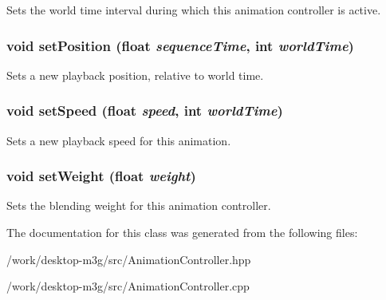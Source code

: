 Sets the world time interval during which this animation controller is active. \hypertarget{classm3g_1_1AnimationController_a20a5553bd449b21bad74666055626f0}{
\subsubsection[{setPosition}]{\setlength{\rightskip}{0pt plus 5cm}void setPosition (float {\em sequenceTime}, \/  int {\em worldTime})}}
\label{classm3g_1_1AnimationController_a20a5553bd449b21bad74666055626f0}


Sets a new playback position, relative to world time. \hypertarget{classm3g_1_1AnimationController_403dae9658751ff86becd82d8a6477f2}{
\subsubsection[{setSpeed}]{\setlength{\rightskip}{0pt plus 5cm}void setSpeed (float {\em speed}, \/  int {\em worldTime})}}
\label{classm3g_1_1AnimationController_403dae9658751ff86becd82d8a6477f2}


Sets a new playback speed for this animation. \hypertarget{classm3g_1_1AnimationController_8859df4d5a61714012bf9e1240189aed}{
\subsubsection[{setWeight}]{\setlength{\rightskip}{0pt plus 5cm}void setWeight (float {\em weight})}}
\label{classm3g_1_1AnimationController_8859df4d5a61714012bf9e1240189aed}


Sets the blending weight for this animation controller. 

The documentation for this class was generated from the following files:\begin{CompactItemize}
\item 
/work/desktop-m3g/src/AnimationController.hpp\item 
/work/desktop-m3g/src/AnimationController.cpp\end{CompactItemize}
